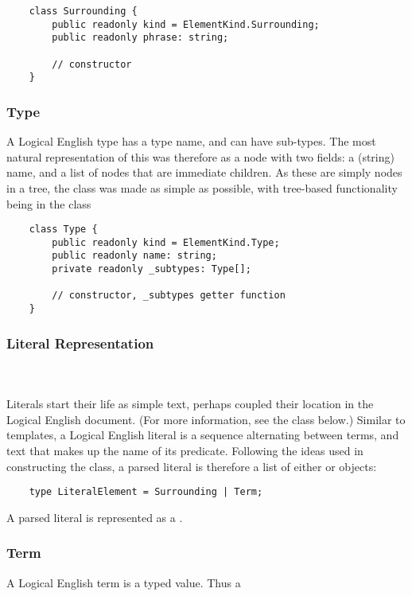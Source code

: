 \documentclass[../main.tex]{subfiles}
\begin{document}
\begin{lstlisting}
    class Surrounding {
        public readonly kind = ElementKind.Surrounding;
        public readonly phrase: string;
        
        // constructor
    }
\end{lstlisting}

\subsubsection{Type}
A Logical English type has a type name, and can have sub-types. The most natural representation of this was therefore as a node with two fields: a (string) name, and a list of nodes that are immediate children. As these are simply nodes in a tree, the  class was made as simple as possible, with tree-based functionality being in the  class 

\begin{lstlisting}
    class Type {
        public readonly kind = ElementKind.Type;
        public readonly name: string;
        private readonly _subtypes: Type[];

        // constructor, _subtypes getter function
    }
\end{lstlisting}

\subsubsection{Literal Representation}
\\ 
\\
Literals start their life as simple text, perhaps coupled their location in the Logical English document. (For more information, see the  class below.) Similar to templates, a Logical English literal is a sequence alternating between terms, and text that makes up the name of its predicate. Following the ideas used in constructing the  class, a parsed literal is therefore a list of either  or  objects:
\begin{lstlisting}
    type LiteralElement = Surrounding | Term;
\end{lstlisting}
A parsed literal is represented as a .

\subsubsection{Term}
A Logical English term is a typed value. Thus a 
 
\end{document}
